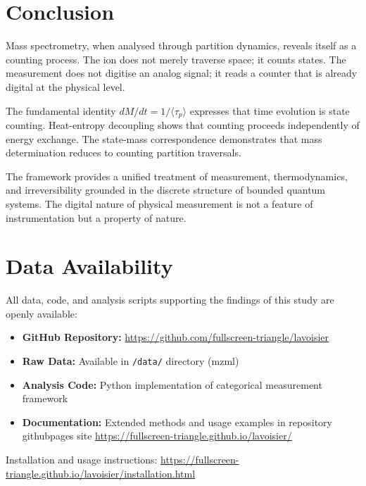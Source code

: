 \section{Conclusion}
\label{sec:conclusion}

Mass spectrometry, when analysed through partition dynamics, reveals itself as a counting process. The ion does not merely traverse space; it counts states. The measurement does not digitise an analog signal; it reads a counter that is already digital at the physical level.

The fundamental identity $dM/dt = 1/\langle\tau_p\rangle$ expresses that time evolution is state counting. Heat-entropy decoupling shows that counting proceeds independently of energy exchange. The state-mass correspondence demonstrates that mass determination reduces to counting partition traversals.

The framework provides a unified treatment of measurement, thermodynamics, and irreversibility grounded in the discrete structure of bounded quantum systems. The digital nature of physical measurement is not a feature of instrumentation but a property of nature.

\section*{Data Availability}

All data, code, and analysis scripts supporting the findings of this study are openly available:

\begin{itemize}[noitemsep]
    \item \textbf{GitHub Repository:} \url{https://github.com/fullscreen-triangle/lavoisier}
    \item \textbf{Raw Data:} Available in \texttt{/data/} directory (mzml)
    \item \textbf{Analysis Code:} Python implementation of categorical measurement framework
    \item \textbf{Documentation:} Extended methods and usage examples in repository githubpages site \url{https://fullscreen-triangle.github.io/lavoisier/}
\end{itemize}

Installation and usage instructions: \url{https://fullscreen-triangle.github.io/lavoisier/installation.html}

